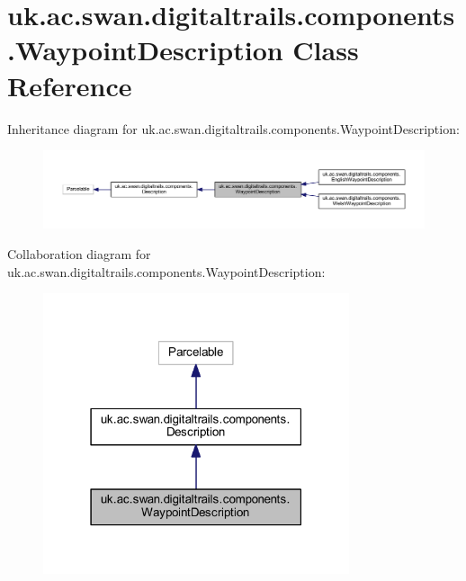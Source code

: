 \hypertarget{classuk_1_1ac_1_1swan_1_1digitaltrails_1_1components_1_1_waypoint_description}{\section{uk.\+ac.\+swan.\+digitaltrails.\+components.\+Waypoint\+Description Class Reference}
\label{classuk_1_1ac_1_1swan_1_1digitaltrails_1_1components_1_1_waypoint_description}
}


Inheritance diagram for uk.\+ac.\+swan.\+digitaltrails.\+components.\+Waypoint\+Description\+:\nopagebreak
\begin{figure}[H]
\begin{center}
\leavevmode
\includegraphics[width=350pt]{classuk_1_1ac_1_1swan_1_1digitaltrails_1_1components_1_1_waypoint_description__inherit__graph}
\end{center}
\end{figure}


Collaboration diagram for uk.\+ac.\+swan.\+digitaltrails.\+components.\+Waypoint\+Description\+:\nopagebreak
\begin{figure}[H]
\begin{center}
\leavevmode
\includegraphics[width=255pt]{classuk_1_1ac_1_1swan_1_1digitaltrails_1_1components_1_1_waypoint_description__coll__graph}
\end{center}
\end{figure}
